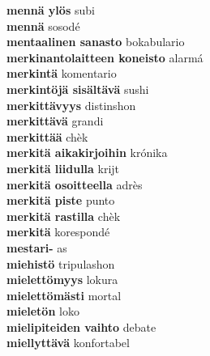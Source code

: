 \textbf{ mennä ylös  } subi \\
\textbf{ mennä  } sosodé \\
\textbf{ mentaalinen sanasto  } bokabulario \\
\textbf{ merkinantolaitteen koneisto  } alarmá \\
\textbf{ merkintä  } komentario \\
\textbf{ merkintöjä sisältävä  } sushi \\
\textbf{ merkittävyys  } distinshon \\
\textbf{ merkittävä  } grandi \\
\textbf{ merkittää  } chèk \\
\textbf{ merkitä aikakirjoihin  } krónika \\
\textbf{ merkitä liidulla  } krijt \\
\textbf{ merkitä osoitteella  } adrès \\
\textbf{ merkitä piste  } punto \\
\textbf{ merkitä rastilla  } chèk \\
\textbf{ merkitä  } korespondé \\
\textbf{ mestari-  } as \\
\textbf{ miehistö  } tripulashon \\
\textbf{ mielettömyys  } lokura \\
\textbf{ mielettömästi  } mortal \\
\textbf{ mieletön  } loko \\
\textbf{ mielipiteiden vaihto  } debate \\
\textbf{ miellyttävä  } konfortabel \\
